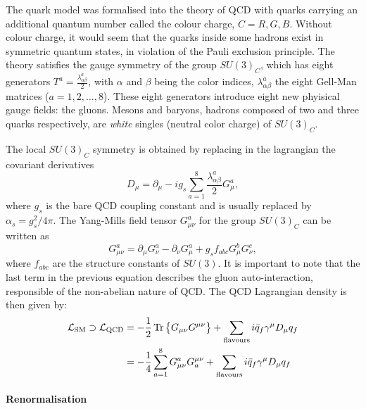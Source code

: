 The quark model was formalised into the theory of \ac{QCD} with quarks carrying an additional quantum number called the colour charge, \(C=R,G,B\). Without colour charge, it would seem that the quarks inside some hadrons exist in symmetric quantum states, in violation of the Pauli exclusion principle.
The theory satisfies the gauge symmetry of the group \(SU(3)_C\), which has eight generators \(T^a = \frac{\lambda_{\alpha\beta}^a}{2}\), with \(\alpha\) and \(\beta\) being the color indices, \(\lambda_{\alpha\beta}^a\) the eight Gell-Man matrices (\(a=1,2,\dots,8\)). These eight generators introduce eight new phyisical gauge fields: the gluons.
Mesons and baryons, hadrons composed of two and three quarks respectively, are \textit{white} singles (neutral color charge) of \(SU(3)_C\). 

The local \(SU(3)_C\) symmetry is obtained by replacing in the lagrangian the covariant derivatives
\begin{equation*}
    D_{\mu} = \partial_{\mu} - i g_s \sum_{a=1}^{8} \frac{\lambda_{\alpha\beta}^a}{2} G_{\mu}^a,
\end{equation*}
where \(g_s\) is the bare \ac{QCD} coupling constant and is usually replaced by \(\alpha_s = g_s^2 / 4\pi\). The Yang-Mills field tensor \(G_{\mu\nu}^a\) for the group \(SU(3)_C\) can be written as
\begin{equation*}
    G_{\mu\nu}^a = \partial_{\mu} G_{\nu}^a - \partial_{\nu} G_{\mu}^a + g_s f_{abc} G_{\mu}^b G_{\nu}^c,
\end{equation*}
where \(f_{abc}\) are the structure constants of \(SU(3)\). It is important to note that the last term in the previous equation describes the gluon auto-interaction, responsible of the non-abelian nature of \ac{QCD}.
The \ac{QCD} Lagrangian density is then given by:
\begin{align*}
    \mathcal{L}_{\text{SM}} \supset \mathcal{L}_{\text{QCD}}
    &=
        -\frac{1}{2} \Tr\left\{G_{\mu\nu}G^{\mu\nu}\right\}
        + 
        \sum_{\text{flavours}} i \bar{q}_f \gamma^{\mu} D_{\mu} q_f\\
    &=
        -\frac{1}{4} \sum_{a=1}^{8} G_{\mu\nu}^a G^{\mu\nu}_a
        + 
        \sum_{\text{flavours}} i \bar{q}_f \gamma^{\mu} D_{\mu} q_f
\end{align*}

\paragraph{Renormalisation}

